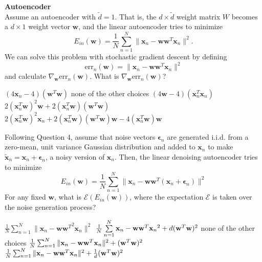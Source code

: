 \documentclass[a4paper,10pt]{exam}
\begin{document}
\begin{questions}
		\question \textbf{Autoencoder}\\
		Assume an autoencoder with $\tilde{d} = 1$. That is, the $d \times \tilde{d}$ weight matrix $W$ becomes a $d \times 1$ weight vector $\mathbf{w}$, and the linear autoencoder tries to minimize 
		\[E_{in}(\mathbf{w}) = \frac{1}{N} \sum_{n=1}^N \|\mathbf{x}_n - \mathbf{w} \mathbf{w}^T \mathbf{x}_n\|^2.\]
		We can solve this problem with stochastic gradient descent by defining
		\[\text{err}_n(\mathbf{w}) = \|\mathbf{x}_n - \mathbf{w} \mathbf{w}^T \mathbf{x}_n\|^2\]
		and calculate $\nabla_\mathbf{w} \text{err}_n(\mathbf{w})$. What is $\nabla_\mathbf{w} \text{err}_n(\mathbf{w})$?
		\begin{choices}
			\choice $(4 \mathbf{x}_n - 4) (\mathbf{w}^T \mathbf{w})$
			\choice none of the other choices
			\choice $(4 \mathbf{w} - 4) (\mathbf{x}_n^T \mathbf{x}_n)$
			\CorrectChoice $2 (\mathbf{x}_n^T \mathbf{w})^2 \mathbf{w} + 2 (\mathbf{x}_n^T \mathbf{w}) (\mathbf{w}^T \mathbf{w})$
			\choice $2 (\mathbf{x}_n^T \mathbf{w})^2 \mathbf{x}_n + 2 (\mathbf{x}_n^T \mathbf{w}) (\mathbf{w}^T \mathbf{w}) \mathbf{w} - 4 (\mathbf{x}_n^T \mathbf{w}) \mathbf{w}$\\
		\end{choices}
		
		\question Following Question 4, assume that noise vectors ${\boldsymbol\epsilon}_n$ are generated i.i.d. from a zero-mean, unit variance Gaussian distribution and added to $\mathbf{x}_n$ to make $\tilde{\mathbf{x}}_n = \mathbf{x}_n + {\boldsymbol\epsilon}_n$, a noisy version of $\mathbf{x}_n$. Then, the linear denoising autoencoder tries to minimize
		\[E_{in}(\mathbf{w}) = \frac{1}{N} \sum_{n=1}^N \|\mathbf{x}_n - \mathbf{w} \mathbf{w}^T (\mathbf{x}_n + {\boldsymbol\epsilon}_n)\| ^2\]
		For any fixed $\mathbf{w}$, what is $\mathcal{E}\left(E_{in}(\mathbf{w})\right)$, where the expectation $\mathcal{E}$ is taken over the noise generation process?
		\begin{choices}
			\choice $\frac{1}{N} \sum_{n=1}^N \|\mathbf{x}_n - {\mathbf{w} \mathbf{w}^T}^2 \mathbf{x}_n\|^2$
			\choice $\frac{1}{N}\sum\limits_{n = 1}^N {{{\bf{x}}_n} - {\bf{w}}{{\bf{w}}^T}{{\bf{x}}_n}{^2}}  + d{({{\bf{w}}^T}{\bf{w}})^2}$
			\choice none of the other choices
			\CorrectChoice $\frac{1}{N} \sum_{n=1}^N \|\mathbf{x}_n - \mathbf{w} \mathbf{w}^T \mathbf{x}_n\|^2 + {({{\bf{w}}^T}{\bf{w}})^2}$
			\choice $\frac{1}{N} \sum_{n=1}^N \|\mathbf{x}_n - \mathbf{w} \mathbf{w}^T \mathbf{x}_n\|^2 + \frac{1}{d} {({{\bf{w}}^T}{\bf{w}})^2}$\\
		\end{choices}
		

\end{questions}
\end{document}

